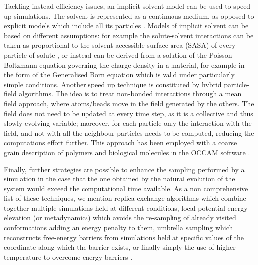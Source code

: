\documentclass[graybox]{svmult}
\begin{document}
Tackling instead efficiency issues, an implicit solvent model can be used to speed up simulations. The solvent is represented as a continuous medium, as opposed to explicit models which include all its particles \cite{Kleinjung2014}.
%
Models of implicit solvent can be based on different assumptions: for example the solute-solvent interactions can be taken as proportional to the solvent-accessible surface area (SASA) of every particle of solute \cite{Fraternali1996,Kleinjung2003,Kleinjung2012,Fornili2012}, or instead can be derived from a solution of the Poisson-Boltzmann equation governing the charge density in a material, for example in the form of the Generalised Born equation \cite{Zhu2005} which is valid under particularly simple conditions.
%
Another speed up technique is constituted by hybrid particle-field algorithms. The idea is to treat non-bonded interactions through a mean field approach, where atoms/beads move in the field generated by the others. The field does not need to be updated at every time step, as it is a collective and thus slowly evolving variable; moreover, for each particle only the interaction with the field, and not with all the neighbour particles needs to be computed, reducing the computations effort further. This approach has been employed with a coarse grain description of polymers and biological molecules in the OCCAM software \cite{Milano2009}.

Finally, further strategies are possible to enhance the sampling performed by a simulation in the case that the one obtained by the natural evolution of the system would exceed the computational time available. As a non comprehensive list of these techniques, we mention replica-exchange algorithms \cite{Okamoto2004} which combine together multiple simulations held at different conditions, local potential-energy elevation (or metadynamics) \cite{Huber1994,Laio2002} which avoids the re-sampling of already visited conformations adding an energy penalty to them, umbrella sampling \cite{Torrie1977} which reconstructs free-energy barriers from simulations held at specific values of the coordinate along which the barrier exists, or finally simply the use of higher temperature to overcome energy barriers \cite{Kirkpatrick1983}.
\end{document}
